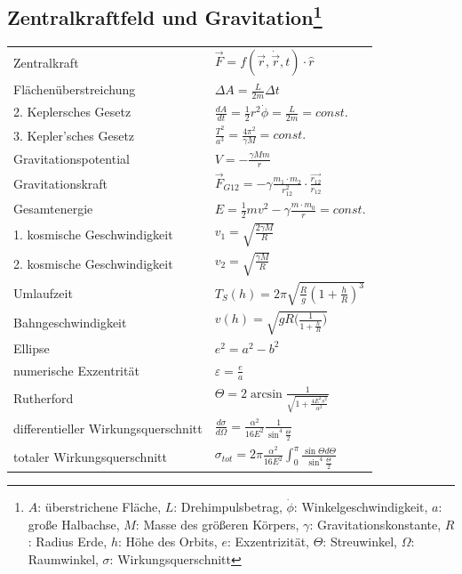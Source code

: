 \documentclass[12pt,a4paper]{article}
\renewcommand{\d}[2]{\frac{d #1}{d #2}}
\renewcommand{\=}[1]{\stackrel{#1}{=}}
\theoremstyle{definition}
\theoremstyle{remark}
\begin{document}
\subsection[Zentralkraftfeld und Gravitation]{Zentralkraftfeld und Gravitation\let\thefootnote\relax\footnote{$A$: überstrichene Fläche, $L$: Drehimpulsbetrag, $\dot \phi$: Winkelgeschwindigkeit, $a$: große Halbachse, $M$: Masse des größeren Körpers, $\gamma$: Gravitationskonstante, $R$: Radius Erde, $h$: Höhe des Orbits, $e$: Exzentrizität, $\Theta$: Streuwinkel, $\Omega$: Raumwinkel, $\sigma$: Wirkungsquerschnitt}}
\begin{center}
\begin{minipage}[t]{.6\linewidth}
\vspace{0pt}
\begin{tabular}{ll}
Zentralkraft & $\vec{F} = f(\vec{r}, \dot{\vec{r}}, t) \cdot \hat{r}$\\
Flächenüberstreichung & $\Delta A = \frac{L}{2m} \Delta t$\\
2. Keplersches Gesetz & $\d{A}{t} = \frac{1}{2} r^2 \dot{\phi} = \frac{L}{2m} = const.$\\
3. Kepler'sches Gesetz & $\frac{T^2}{a^3} = \frac{4 \pi^2}{\gamma M} = const.$\\
Gravitationspotential & $V = - \frac{\gamma M m}{r}$\\
Gravitationskraft & $\vec{F}_{G12} = - \gamma \frac{m_1 \cdot m_2}{r_{12}^2} \cdot \frac{\vec{r_{12}}}{r_{12}}$\\
Gesamtenergie & $E = \frac{1}{2}mv^2 - \gamma \frac{m \cdot m_0}{r} = const.$\\
1. kosmische Geschwindigkeit & $v_1 = \sqrt{\frac{2 \gamma M}{R}}$\\
2. kosmische Geschwindigkeit & $v_2 = \sqrt{\frac{\gamma M}{R}}$\\
Umlaufzeit & $T_S(h) = 2 \pi \sqrt{\frac{R}{g}(1+\frac{h}{R})^3}$\\
Bahngeschwindigkeit & $v(h) = \sqrt{gR \Big(\frac{1}{1+\frac{h}{R}}\Big)}$\\
Ellipse & $e^2 = a^2-b^2$\\
numerische Exzentrität & $\varepsilon = \frac{e}{a}$\\
Rutherford &  $\Theta = 2 \arcsin \frac{1}{\sqrt{1 + \frac{4 E^2 s ^2 }{\alpha ^2}}}$\\
differentieller Wirkungsquerschnitt & $\d{\sigma}{\Omega} = \frac{\alpha ^2}{16E^2} \frac{1}{\sin^4 \frac{\Theta}{2}}$\\
totaler Wirkungsquerschnitt & $\sigma_{tot} = 2\pi \frac{\alpha^2}{16E^2} \int_0^{\pi} \frac{\sin \Theta d\Theta}{\sin^4 \frac{\Theta}{2}}$\\

\end{tabular}
\end{minipage}
\end{center}
\end{document}
